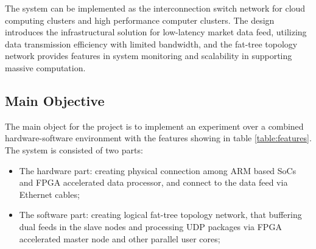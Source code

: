\documentclass[11pt,openright,a4paper]{report}
\begin{document}
The system can be implemented as the interconnection switch network for cloud computing clusters and high performance computer clusters. The design introduces the infrastructural solution for low-latency market data feed, utilizing data transmission efficiency with limited bandwidth, and the fat-tree topology network provides features in system monitoring and scalability in supporting massive computation.\\  
\subsection{Main Objective}
The main object for the project is to implement an experiment over a combined hardware-software environment with the features showing in table \ref{table:features}. The system is consisted of two parts:\\
\begin{itemize}
	\item The hardware part: creating physical connection among ARM based SoCs and FPGA accelerated data processor, and connect to the data feed via Ethernet cables;
	\item The software part: creating logical fat-tree topology network, that buffering dual feeds in the slave nodes and processing UDP packages via FPGA accelerated master node and other parallel user cores; 
\end{itemize}
\end{document}
